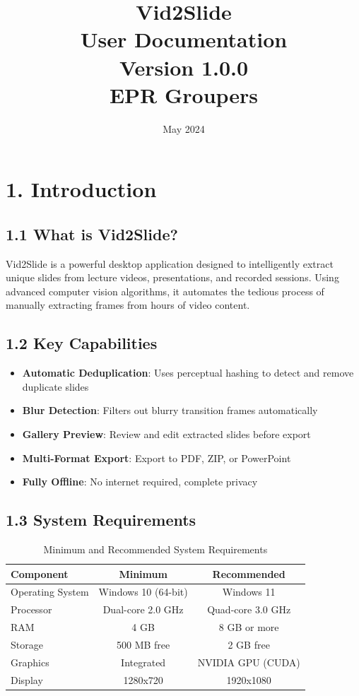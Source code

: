 \documentclass[12pt,a4paper]{article}
\title{\textbf{\LARGE Vid2Slide}\\[0.5em]
\textbf{\huge User Documentation}\\[1em]
{\large Version 1.0.0}\\[2em]
{\large \textbf{EPR Groupers}}}
\author{}
\date{\vspace{2em}\large May 2024}
\newcommand{\sectionTitle}[1]{\section*{#1}}
\newcommand{\subsectionTitle}[1]{\subsection*{#1}}
\begin{document}
\maketitle
\thispagestyle{empty}

\newpage
\pagestyle{fancy}
\fancyhf{}
\rfoot{\thepage}

\tableofcontents
\newpage

\sectionTitle{1. Introduction}

\subsectionTitle{1.1 What is Vid2Slide?}
Vid2Slide is a powerful desktop application designed to intelligently extract unique slides from lecture videos, presentations, and recorded sessions. Using advanced computer vision algorithms, it automates the tedious process of manually extracting frames from hours of video content.

\subsectionTitle{1.2 Key Capabilities}
\begin{itemize}
    \item \textbf{Automatic Deduplication}: Uses perceptual hashing to detect and remove duplicate slides
    \item \textbf{Blur Detection}: Filters out blurry transition frames automatically
    \item \textbf{Gallery Preview}: Review and edit extracted slides before export
    \item \textbf{Multi-Format Export}: Export to PDF, ZIP, or PowerPoint
    \item \textbf{Fully Offline}: No internet required, complete privacy
\end{itemize}

\subsectionTitle{1.3 System Requirements}

\begin{table}[H]
    \centering
    \caption{Minimum and Recommended System Requirements}
    \begin{tabular}{lcc}
        \toprule
        \textbf{Component} & \textbf{Minimum} & \textbf{Recommended} \\
        \midrule
        Operating System & Windows 10 (64-bit) & Windows 11 \\
        Processor & Dual-core 2.0 GHz & Quad-core 3.0 GHz \\
        RAM & 4 GB & 8 GB or more \\
        Storage & 500 MB free & 2 GB free \\
        Graphics & Integrated & NVIDIA GPU (CUDA) \\
        Display & 1280x720 & 1920x1080 \\
        \bottomrule
    \end{tabular}
\end{table}
\end{document}
